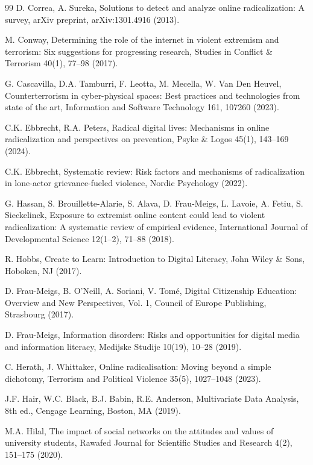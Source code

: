 \documentclass{NSP1}
\begin{document}
\begin{thebibliography}{99}
D. Correa, A. Sureka, Solutions to detect and analyze online radicalization: A survey, arXiv preprint, arXiv:1301.4916 (2013).

M. Conway, Determining the role of the internet in violent extremism and terrorism: Six suggestions for progressing research, Studies in Conflict \& Terrorism 40(1), 77–98 (2017).

G. Cascavilla, D.A. Tamburri, F. Leotta, M. Mecella, W. Van Den Heuvel, Counterterrorism in cyber-physical spaces: Best practices and technologies from state of the art, Information and Software Technology 161, 107260 (2023).

C.K. Ebbrecht, R.A. Peters, Radical digital lives: Mechanisms in online radicalization and perspectives on prevention, Psyke \& Logos 45(1), 143–169 (2024).

C.K. Ebbrecht, Systematic review: Risk factors and mechanisms of radicalization in lone-actor grievance-fueled violence, Nordic Psychology (2022).

G. Hassan, S. Brouillette-Alarie, S. Alava, D. Frau-Meigs, L. Lavoie, A. Fetiu, S. Sieckelinck, Exposure to extremist online content could lead to violent radicalization: A systematic review of empirical evidence, International Journal of Developmental Science 12(1–2), 71–88 (2018).

R. Hobbs, Create to Learn: Introduction to Digital Literacy, John Wiley \& Sons, Hoboken, NJ (2017).

D. Frau-Meigs, B. O'Neill, A. Soriani, V. Tomé, Digital Citizenship Education: Overview and New Perspectives, Vol. 1, Council of Europe Publishing, Strasbourg (2017).

D. Frau-Meigs, Information disorders: Risks and opportunities for digital media and information literacy, Medijske Studije 10(19), 10–28 (2019).

C. Herath, J. Whittaker, Online radicalisation: Moving beyond a simple dichotomy, Terrorism and Political Violence 35(5), 1027–1048 (2023).

J.F. Hair, W.C. Black, B.J. Babin, R.E. Anderson, Multivariate Data Analysis, 8th ed., Cengage Learning, Boston, MA (2019).

M.A. Hilal, The impact of social networks on the attitudes and values of university students, Rawafed Journal for Scientific Studies and Research 4(2), 151–175 (2020).


\end{thebibliography}
\end{document}

